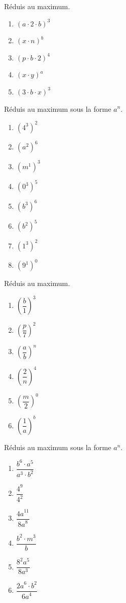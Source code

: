 \begin{exercise}
  Réduis au maximum.
  \begin{enumerate}[cols=5]
    \item \((a \cdot 2 \cdot b)^{3} \)
    \item \((x \cdot n)^{b} \)
    \item \((p \cdot b \cdot 2)^{4} \)
    \item \((x \cdot y)^{a} \)
    \item \((3 \cdot b \cdot x)^{3} \)    
  \end{enumerate}
\end{exercise}

\begin{exercise}
  Réduis au maximum sous la forme $a^n$.
  \begin{enumerate}[cols=6]
    \item \(\left( 4^{3} \right)^{2}\)
    \item \(\left( a^{2} \right)^{6}\)
    \item \(\left( m^{1} \right)^{3}\)
    \item \(\left( 0^{3} \right)^{5}\)
    \item \(\left( b^{3} \right)^{6}\)
    \item \(\left( b^{2} \right)^{5}\)
    \item \(\left( 1^{3} \right)^{2}\)
    \item \(\left( 9^{1} \right)^{0}\)
  \end{enumerate}
\end{exercise}

\begin{exercise}
  Réduis au maximum.
  \begin{enumerate}[cols=6]
    \item \(\left( \dfrac{b}{1} \right)^{3} \)
    \item \(\left( \dfrac{p}{7} \right)^{2} \)
    \item \(\left( \dfrac{a}{b} \right)^{n} \)
    \item \(\left( \dfrac{2}{n} \right)^{4} \)
    \item \(\left( \dfrac{m}{2} \right)^{0} \)
    \item \(\left( \dfrac{1}{a} \right)^{b} \)
  \end{enumerate}
\end{exercise}

\begin{exercise}
  Réduis au maximum sous la forme $a^n$.
  \begin{enumerate}[cols=3]
    \item \(\dfrac{b^{6} \cdot a^{5}}{a^{3} \cdot b^{2}} \)
    \item \(\dfrac{4^{9}}{4^{2}} \)
    \item \(\dfrac{{4a}^{11}}{{8a}^{8}} \)
    \item \(\dfrac{b^{2} \cdot m^{3}}{b} \)
    \item \(\dfrac{8^{2}a^{5}}{8a^{3}} \)
    \item \(\dfrac{{2a}^{6} \cdot b^{2}}{{6a}^{4}} \)
  \end{enumerate}
\end{exercise}

